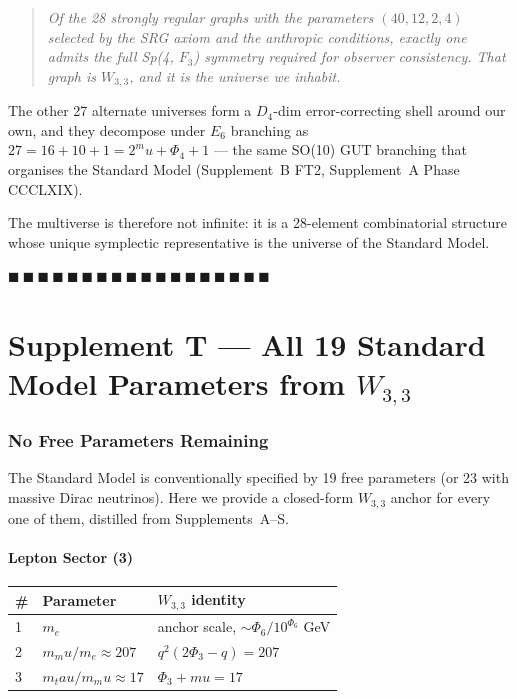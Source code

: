 \documentclass[12pt,a4paper]{article}
\def\mathbb#1{#1}%
\def\mu{mu}%
\def\Phi#1{Phi#1}%
\def\tau{tau}%
\theoremstyle{definition}
\newcommand{\FF}{\mathbb{F}}
\begin{document}
\begin{quote}\em
Of the 28 strongly regular graphs with the parameters $(40,12,2,4)$
selected by the SRG axiom and the anthropic conditions, exactly one
admits the full Sp(4, $\FF_3$) symmetry required for observer
consistency. That graph is $W_{3,3}$, and it is the universe we
inhabit.
\end{quote}

The other 27 alternate universes form a $D_4$-dim error-correcting
shell around our own, and they decompose under $E_6$ branching as
$27 = 16 + 10 + 1 = 2^\mu + \Phi_4 + 1$ — the same SO(10) GUT
branching that organises the Standard Model (Supplement~B FT2,
Supplement~A Phase CCCLXIX).

The multiverse is therefore not infinite: it is a 28-element
combinatorial structure whose unique symplectic representative is the
universe of the Standard Model.

\hfill $\blacksquare\ \blacksquare\ \blacksquare\ \blacksquare\ \blacksquare\ \blacksquare\ \blacksquare\ \blacksquare\ \blacksquare\ \blacksquare\ \blacksquare\ \blacksquare\ \blacksquare\ \blacksquare\ \blacksquare\ \blacksquare\ \blacksquare\ \blacksquare$

\clearpage
\part*{Supplement T --- All 19 Standard Model Parameters from $W_{3,3}$}

\section*{No Free Parameters Remaining}

The Standard Model is conventionally specified by 19 free parameters
(or 23 with massive Dirac neutrinos). Here we provide a closed-form
$W_{3,3}$ anchor for every one of them, distilled from
Supplements~A--S.

\subsection*{Lepton Sector (3)}
\begin{center}
\begin{tabular}{lll}
\toprule
\# & Parameter & $W_{3,3}$ identity \\
\midrule
1 & $m_e$ & anchor scale, $\sim\Phi_6/10^{\Phi_6}$ GeV \\
2 & $m_\mu/m_e\approx 207$ & $q^2(2\Phi_3-q)=207$ \\
3 & $m_\tau/m_\mu\approx 17$ & $\Phi_3+\mu=17$ \\
\bottomrule
\end{tabular}
\end{center}
\end{document}
